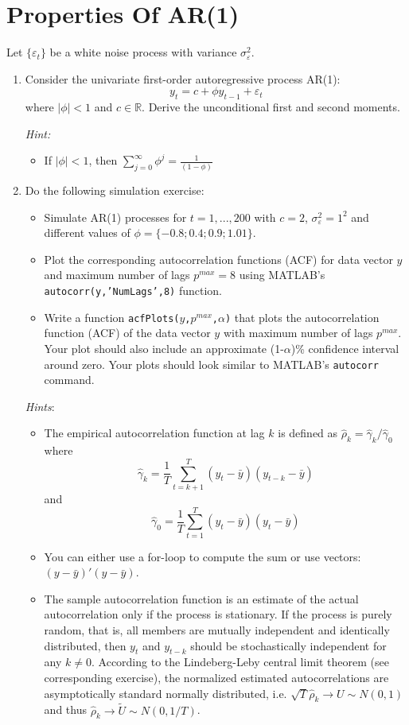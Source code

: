 \section[Properties of AR(1)]{Properties Of AR(1)\label{ex:PropertiesAR1}}

Let $\{\varepsilon_t\}$ be a white noise process with variance $\sigma_\varepsilon^2$.

\begin{enumerate}
\item Consider the univariate first-order autoregressive process AR(1): 
$$y_t = c + \phi y_{t-1} + \varepsilon_{t}$$
where $|\phi|<1$ and $c\in \mathbb{R}$.
Derive the unconditional first and second moments.

\emph{Hint:}
\begin{itemize}
	\item If $|\phi|<1$, then $\sum_{j=0}^{\infty} \phi^j = \frac{1}{(1-\phi)}$
\end{itemize}

\item Do the following simulation exercise:
\begin{itemize}
	\item Simulate AR(1) processes for $t=1,...,200$ with $c=2$, $\sigma_\varepsilon^2 = 1^2$ and different values of $\phi=\{-0.8;0.4;0.9;1.01\}$.
	\item Plot the corresponding autocorrelation functions (ACF) for data vector $y$ and maximum number of lags $p^{max}=8$ using MATLAB's \texttt{autocorr(y,'NumLags',8)} function.
	\item Write a function \texttt{acfPlots($y$,$p^{max}$,$\alpha$)} that plots the autocorrelation function (ACF) of the data vector $y$ with maximum number of lags $p^{max}$.
	Your plot should also include an approximate (1-$\alpha$)\% confidence interval around zero.
	Your plots should look similar to MATLAB's \texttt{autocorr} command.
\end{itemize}
	
\emph{Hints}:
\begin{itemize}
	\item The empirical autocorrelation function at lag $k$ is defined as $\hat{\rho}_k = \hat{\gamma}_k/\hat{\gamma}_0$ where
	  $$\hat{\gamma}_k = \frac{1}{T} \sum_{t=k+1}^T (y_t - \bar{y})(y_{t-k}-\bar{y})$$ and $$\hat{\gamma}_0 = \frac{1}{T} \sum_{t=1}^T (y_t - \bar{y})(y_{t}-\bar{y})$$
	\item You can either use a for-loop to compute the sum or use vectors: $(y - \bar{y})'(y - \bar{y})$.
	\item The sample autocorrelation function is an estimate of the actual autocorrelation only if the process is stationary.
	If the process is purely random, that is, all members are mutually independent and identically distributed,
	  then $y_t$ and $y_{t-k}$ should be stochastically independent for any $k\neq 0$.
	According to the Lindeberg-Leby central limit theorem (see corresponding exercise),
	  the normalized estimated autocorrelations are asymptotically standard normally distributed,
	  i.e. $\sqrt{T} \hat{\rho}_k \rightarrow U \sim N(0,1)$ and thus $\hat{\rho}_k \rightarrow \tilde{U} \sim N(0,1/T)$.
\end{itemize}


\end{enumerate}

